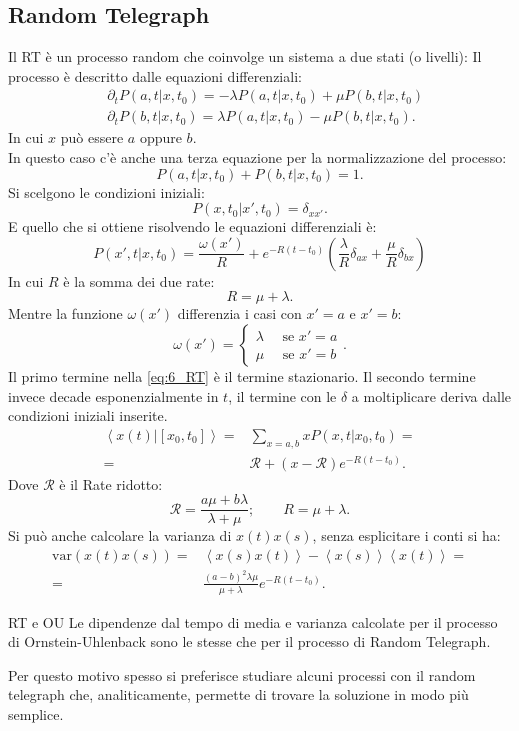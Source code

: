 \subsection{Random Telegraph}%
\label{sub:Random Telegraph}
Il RT è un processo random che coinvolge un sistema a due stati (o livelli):
%
Il processo è descritto dalle equazioni differenziali:
\[\begin{aligned}
    &\partial_{t}P\left(a,t|x,t_0\right) = -\lambda P\left(a,t|x,t_0\right) + \mu P\left(b,t|x,t_0\right)\\
    &\partial_{t}P\left(b,t|x,t_0\right) = \lambda P\left(a,t|x,t_0\right) - \mu P\left(b,t|x,t_0\right)
.\end{aligned}\]
In cui $x$ può essere $a$ oppure $b$.\\
In questo caso c'è anche una terza equazione per la normalizzazione del processo:
\[
    P\left(a,t|x,t_0\right)+ P\left(b,t|x,t_0\right) = 1
.\] 
Si scelgono le condizioni iniziali:
\[
    P\left(x,t_0|x',t_0\right) = \delta_{xx'}
.\] 
E quello che si ottiene risolvendo le equazioni differenziali è:
\begin{equation}
    P\left(x', t|x,t_0\right) =  \frac{\omega (x') }{R} + e^{-R (t-t_0)}\left(\frac{\lambda}{R}\delta_{ax} + \frac{\mu}{R}\delta_{bx}\right)
    \label{eq:6_RT}
\end{equation}
In cui $R$ è la somma dei due rate:
\[
    R = \mu +\lambda
.\] 
Mentre la funzione $\omega (x')$ differenzia i casi con $x'=a$ e $x'=b$:
\[
    \omega(x') =
    \begin{cases}
        \lambda  \quad \text{ se } x' = a\\
        \mu  \quad \text{ se } x' = b
    \end{cases}
.\]
Il primo termine nella \ref{eq:6_RT} è il termine stazionario. Il secondo termine invece decade esponenzialmente in $t$, il termine con le  $\delta$  a moltiplicare deriva dalle condizioni iniziali inserite.
\[\begin{aligned}
    \left<x(t) | \left[x_0,t_0\right]\right> = & \sum_{x = a,b}^{} xP\left(x,t|x_0,t_0\right) = \\
					      = &\mathcal{R} + \left(x-\mathcal{R}\right)e^{-R(t-t_0)}
.\end{aligned}\]
Dove $\mathcal{R}$ è il Rate ridotto:
\[
\mathcal{R} = \frac{ a\mu + b\lambda}{\lambda + \mu}; \qquad R = \mu + \lambda
.\] 
Si può anche calcolare la varianza di $x(t)x(s)$, senza esplicitare i conti si ha:
\[\begin{aligned}
    \text{var}(x(t) x(s) ) = & \left<x(s) x(t) \right> - \left<x(s)\right>\left<x(t) \right> = \\
			     =& \frac{\left(a-b\right)^2\lambda\mu}{\mu +\lambda}e^{-R(t-t_0) }
.\end{aligned}\]
\begin{bluebox}{RT e OU}
    Le dipendenze dal tempo di media e varianza calcolate per il processo di Ornstein-Uhlenback sono le stesse che per il processo di Random Telegraph.
\end{bluebox}
\noindent
Per questo motivo spesso si preferisce studiare alcuni processi con il random telegraph che, analiticamente, permette di trovare la soluzione in modo più semplice.

